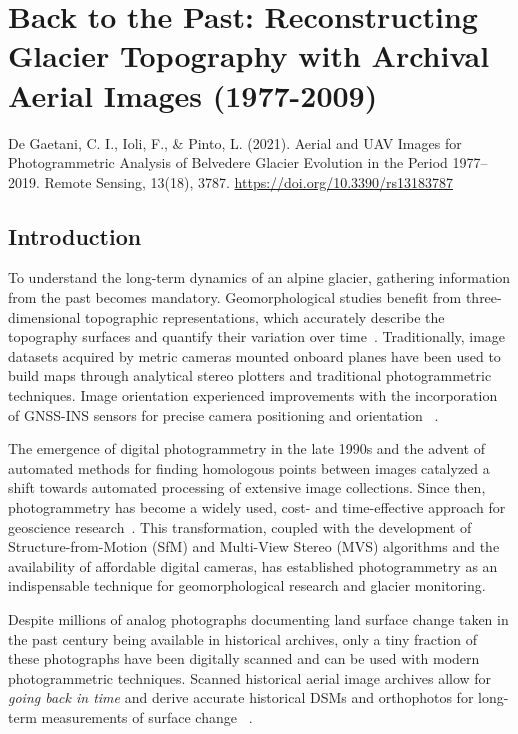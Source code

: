 \graphicspath{{figures/chapter2/}}
\onehalfspacing

\chapter{Back to the Past: Reconstructing Glacier Topography with Archival Aerial Images
  (1977-2009)}\label{ch:2}
  
\vfill


\noindent De Gaetani, C. I., Ioli, F., \& Pinto, L. (2021). Aerial and UAV Images for
Photogrammetric Analysis of Belvedere Glacier Evolution in the Period 1977–2019. Remote
Sensing, 13(18), 3787. \url{https://doi.org/10.3390/rs13183787}

\newpage

\section{Introduction}\label{sec:2:introduction}

To understand the long-term dynamics of an alpine glacier, gathering information from the past becomes mandatory. 
Geomorphological studies benefit from three-dimensional topographic representations, which accurately describe the topography surfaces and quantify their variation over time~\citep{chandler1995steady}.
Traditionally, image datasets acquired by metric cameras mounted onboard planes have been used to build maps through analytical stereo plotters and traditional photogrammetric techniques. 
Image orientation experienced improvements with the incorporation of GNSS-INS sensors for precise camera positioning and orientation
~\citep{Forlani_pinto2001, jacobsen2004issues}.

The emergence of digital photogrammetry in the late 1990s and the advent of automated methods for finding homologous points between images catalyzed a shift towards automated processing of extensive image collections. 
Since then, photogrammetry has become a widely used, cost- and time-effective approach for geoscience research~\citep{Lane2000}.
This transformation, coupled with the development of Structure-from-Motion (SfM) and Multi-View Stereo (MVS) algorithms and the availability of affordable digital cameras, has established photogrammetry as an indispensable technique for geomorphological research and glacier monitoring.

Despite millions of analog photographs documenting land surface change taken in the past century being available in historical archives, only a tiny fraction of these photographs have been digitally scanned and can be used with modern photogrammetric techniques. 
Scanned historical aerial image archives allow for \textit{going back in time} and derive accurate historical DSMs and orthophotos for long-term measurements of surface change ~\citep{Micheletti2015}.

